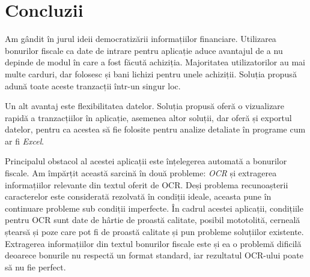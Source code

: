 \chapter*{Concluzii}\label{conclusions}

Am gândit \AppName{} în jurul ideii democratizării informațiilor financiare. Utilizarea bonurilor fiscale ca date de intrare pentru aplicație aduce avantajul de a nu depinde de modul în care a fost făcută achiziția. Majoritatea utilizatorilor au mai multe carduri, dar folosesc și bani lichizi pentru unele achiziții. Soluția propusă adună toate aceste tranzacții într-un singur loc.

Un alt avantaj este flexibilitatea datelor. Soluția propusă oferă o vizualizare rapidă a tranzacțiilor în aplicație, asemenea altor soluții, dar oferă și exportul datelor, pentru ca acestea să fie folosite pentru analize detaliate în programe cum ar fi \emph{Excel}.

Principalul obstacol al acestei aplicații este înțelegerea automată a bonurilor fiscale. Am împărțit această sarcină în două probleme: \emph{OCR} și extragerea informațiilor relevante din textul oferit de OCR. Deși problema recunoașterii caracterelor este considerată rezolvată în condiții ideale, aceasta pune în continuare probleme sub condiții imperfecte. În cadrul acestei aplicații, condițiile pentru OCR sunt date de hârtie de proastă calitate, posibil mototolită, cerneală ștearsă și poze care pot fi de proastă calitate și pun probleme soluțiilor existente. Extragerea informațiilor din textul bonurilor fiscale este și ea o problemă dificilă deoarece bonurile nu respectă un format standard, iar rezultatul OCR-ului poate să nu fie perfect. 
